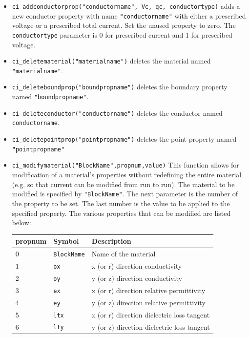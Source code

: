 \begin{itemize}
To obtain a ``Mixed'' type boundary condition, set \texttt{C1} and
\texttt{C0} as required and \texttt{BdryFormat} to 1. Set all other
parameters to zero.

To obtain a prescribes surface current density, set \texttt{qs} to
the desired current density in A/m$^{2}$ and set \texttt{BdryFormat}
to 2.

For a ``Periodic'' boundary condition, set \texttt{BdryFormat} to 3
and set all other parameters to zero.

For an ``Anti-Perodic'' boundary condition, set \texttt{BdryFormat}
to 4 set all other parameters to zero.

\item \texttt{ci\_addconductorprop("conductorname", Vc, qc, conductortype)} adds a new
conductor property with name \texttt{"conductorname"} with either a
prescribed voltage or a prescribed total current. Set the unused
property to zero. The \texttt{conductortype} parameter is 0 for
prescribed current and 1 for prescribed voltage.

\item \texttt{ci\_deletematerial("materialname")} deletes the material named
\texttt{"materialname"}.

\item \texttt{ci\_deleteboundprop("boundpropname")} deletes the boundary property
named \texttt{"boundpropname"}.

\item \texttt{ci\_deleteconductor("conductorname")} deletes the conductor named
\texttt{conductorname}.

\item \texttt{ci\_deletepointprop("pointpropname")} deletes the point property named
\texttt{"pointpropname"}

\item \texttt{ci\_modifymaterial("BlockName",propnum,value)} This function allows for
modification of a material's properties without redefining the
entire material (e.g. so that current can be modified from run to
run). The material to be modified is specified by
\texttt{"BlockName"}. The next parameter is the number of the
property to be set. The last number is the value to be applied to
the specified property. The various properties that can be modified
are listed below:

\begin{tabular}{lll}
propnum & Symbol &  Description \\ \hline
 0 & \texttt{BlockName} & Name of the material \\
 1 & \texttt{ox} & x (or r) direction conductivity \\
 2 & \texttt{oy} & y (or z) direction conductivity \\
 3 & \texttt{ex} & x (or r) direction relative permittivity \\
 4 & \texttt{ey} & y (or z) direction relative permittivity \\
 5 & \texttt{ltx} & x (or r) direction dielectric loss tangent \\
 6 & \texttt{lty} & y (or z) direction dielectric loss tangent \\
\end{tabular}



\end{itemize}
